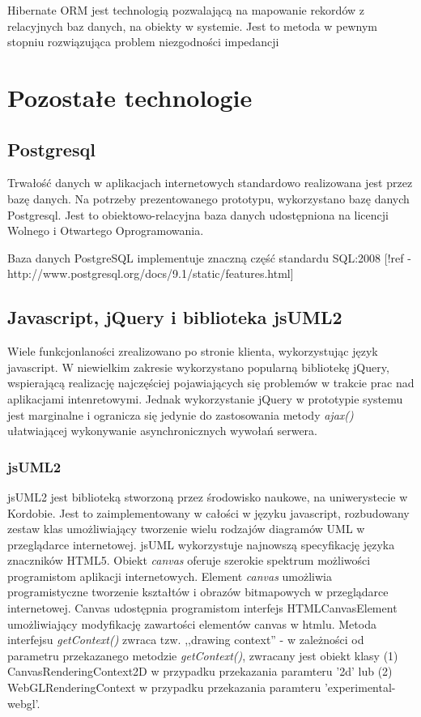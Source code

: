       Hibernate ORM jest technologią pozwalającą na mapowanie rekordów z relacyjnych baz danych, na obiekty w systemie. Jest to metoda w pewnym stopniu rozwiązująca problem niezgodności impedancji \cite{KSub01}

  \section{Pozostałe technologie}
    \subsection{Postgresql}
      Trwałość danych w aplikacjach internetowych standardowo realizowana jest przez bazę danych. Na potrzeby prezentowanego prototypu, wykorzystano bazę danych Postgresql. Jest to obiektowo-relacyjna baza danych udostępniona na licencji Wolnego i Otwartego Oprogramowania. 

      Baza danych PostgreSQL implementuje znaczną część standardu SQL:2008 [!ref - http://www.postgresql.org/docs/9.1/static/features.html]

    \subsection{Javascript, jQuery i biblioteka jsUML2}

      Wiele funkcjonlaności zrealizowano po stronie klienta, wykorzystując język javascript. W niewielkim zakresie wykorzystano popularną bibliotekę jQuery, wspierającą realizację najczęściej pojawiających się problemów w trakcie prac nad aplikacjami intenretowymi. Jednak wykorzystanie jQuery w prototypie systemu jest marginalne i ogranicza się jedynie do zastosowania metody \emph{ajax()} ułatwiającej wykonywanie asynchronicznych wywołań serwera.

      \subsubsection{jsUML2}
        jsUML2 jest biblioteką stworzoną przez środowisko naukowe, na uniwerystecie w Kordobie. Jest to zaimplementowany w całości w języku javascript, rozbudowany zestaw klas umożliwiający tworzenie wielu rodzajów diagramów UML w przeglądarce internetowej. jsUML wykorzystuje najnowszą specyfikację języka znaczników HTML5. Obiekt \emph{canvas} oferuje szerokie spektrum możliwości programistom aplikacji internetowych. Element \emph{canvas} umożliwia programistyczne tworzenie kształtów i obrazów bitmapowych w przeglądarce internetowej. Canvas udostępnia programistom interfejs HTMLCanvasElement umożliwiający modyfikację zawartości elementów canvas w htmlu. Metoda interfejsu \emph{getContext()} zwraca tzw. ,,drawing context'' - w zależności od parametru przekazanego metodzie \emph{getContext()}, zwracany jest obiekt klasy (1) CanvasRenderingContext2D w przypadku przekazania paramteru '2d' lub (2) WebGLRenderingContext w przypadku przekazania paramteru 'experimental-webgl'.

